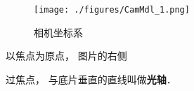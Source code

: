 
\begin{figure}[ht]
\centering
\texttt{[image: ./figures/CamMdl\_1.png]}
\caption{相机坐标系} \label{CamMdl_fig1}
\end{figure}

以焦点为原点， 图片的右侧

过焦点， 与底片垂直的直线叫做\textbf{光轴}．
